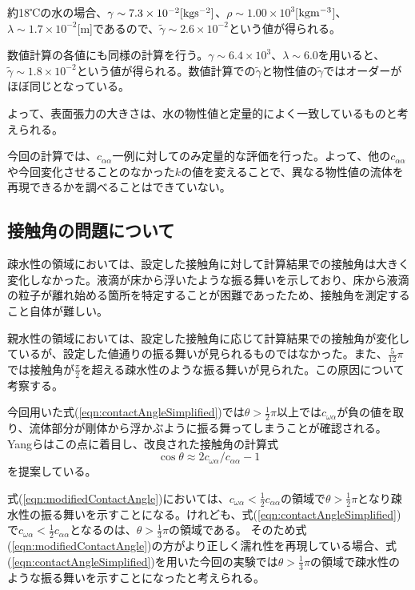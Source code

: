 \documentclass[]{jsarticle}
\begin{document}
約18℃の水の場合、$\gamma\sim 7.3\times 10^{-2}\rm{[kgs^{-2}]}$、$\rho\sim 1.00\times 10^3$[$\rm{kgm^{-3}}$]、$\lambda\sim 1.7\times10^{-2}$[m]であるので\cite{tatsumiKiso}、$\tilde{\gamma}\sim 2.6\times10^{-2}$という値が得られる。

数値計算の各値にも同様の計算を行う。$\gamma\sim6.4\times 10^3$、$\lambda\sim 6.0$を用いると、$\tilde{\gamma}\sim1.8\times 10^{-2}$という値が得られる。数値計算での$\tilde{\gamma}$と物性値の$\tilde{\gamma}$ではオーダーがほぼ同じとなっている。

よって、表面張力の大きさは、水の物性値と定量的によく一致しているものと考えられる。

今回の計算では、$c_{\alpha\alpha}$一例に対してのみ定量的な評価を行った。よって、他の$c_{\alpha\alpha}$や今回変化させることのなかった$k$の値を変えることで、異なる物性値の流体を再現できるかを調べることはできていない。

\subsection{接触角の問題について}
\label{subsec:discContact}
疎水性の領域においては、設定した接触角に対して計算結果での接触角は大きく変化しなかった。液滴が床から浮いたような振る舞いを示しており、床から液滴の粒子が離れ始める箇所を特定することが困難であったため、接触角を測定すること自体が難しい。

親水性の領域においては、設定した接触角に応じて計算結果での接触角が変化しているが、設定した値通りの振る舞いが見られるものではなかった。また、$\frac{5}{12}\pi$では接触角が$\frac{\pi}{2}$を超える疎水性のような振る舞いが見られた。この原因について考察する。

今回用いた式(\ref{eqn:contactAngleSimplified})では$\theta>\frac{1}{2}\pi$以上では$c_{\omega\alpha}$が負の値を取り、流体部分が剛体から浮かぶように振る舞ってしまうことが確認される。Yang\cite{Yang2017}らはこの点に着目し、改良された接触角の計算式
\begin{equation}
  \label{eqn:modifiedContactAngle}
\cos \theta \approx 2c_{\omega\alpha}/c_{\alpha\alpha} -1
\end{equation}
を提案している。

式(\ref{eqn:modifiedContactAngle})においては、$c_{\omega\alpha}<\frac{1}{2}c_{\alpha\alpha}$の領域で$\theta>\frac{1}{2}\pi$となり疎水性の振る舞いを示すことになる。けれども、式(\ref{eqn:contactAngleSimplified})で$c_{\omega\alpha}<\frac{1}{2}c_{\alpha\alpha}$となるのは、$\theta>\frac{1}{3}\pi$の領域である。
そのため式(\ref{eqn:modifiedContactAngle})の方がより正しく濡れ性を再現している場合、式(\ref{eqn:contactAngleSimplified})を用いた今回の実験では$\theta>\frac{1}{3}\pi$の領域で疎水性のような振る舞いを示すことになったと考えられる。
\end{document}
